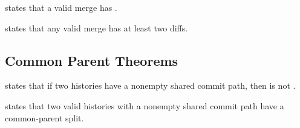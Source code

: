\begin{theorem}
 states that a valid merge has
.
\end{theorem}

\begin{theorem}
 states that any valid merge has at least
two diffs.
\end{theorem}

\subsection{Common Parent Theorems}

\begin{theorem}
 states that if two histories have a
nonempty shared commit path, then  is not
.
\end{theorem}

\begin{theorem}
 states that two valid histories with a
nonempty shared commit path have a common-parent split.
\end{theorem}
